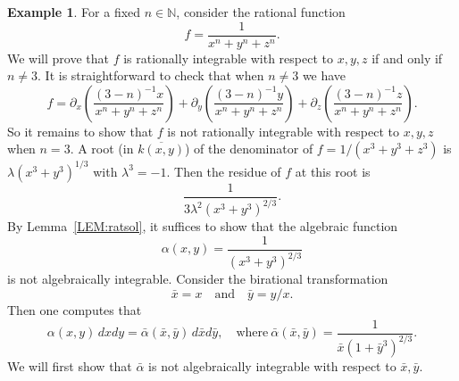\documentclass{amsart}
\theoremstyle{definition}
\newtheorem{example}[thm]{Example}
\def\NX{{\mathbb N}}
\numberwithin{equation}{section}
\numberwithin{thm}{section}
\begin{document}
\begin{example}
\label{EXAM:notint}
For a fixed $n\in \NX$, consider the rational function
\[
f = \frac{1}{x^n + y^n + z^n}.
\]
We will prove that $f$ is rationally integrable with respect to $x, y, z$ if and only if $n\neq 3$. It is straightforward to check that when $n\neq 3$ we have
\[
f = \partial_x\left(\frac{(3-n)^{-1}x}{x^n + y^n + z^n}\right) +  \partial_y\left(\frac{(3-n)^{-1}y}{x^n + y^n + z^n}\right) + \partial_z\left(\frac{(3-n)^{-1}z}{x^n + y^n + z^n}\right).
\]
So it remains to show that $f$ is not rationally integrable with respect to $x, y, z$ when $n=3$. A root (in $\overline{k(x, y)}$) of the denominator of $f = 1/(x^3+y^3+z^3)$ is $\lambda (x^3 + y^3)^{1/3}$ with $\lambda^3=-1$. Then the residue of $f$ at this root is
\[
\frac{1}{3\lambda^{2}(x^3 + y^3)^{2/3}}.
\]
By Lemma~\ref{LEM:ratsol}, it suffices to show that the algebraic function
\[
\alpha(x, y)= \frac{1}{(x^3 + y^3)^{2/3}}
\]
is not algebraically integrable. Consider the birational transformation
\[\bar{x} = x \quad \text{and} \quad \bar{y} = y/x.\]
Then one computes that
\begin{equation}\label{EQ:alphabaralpha}
\alpha(x, y) \,dx  dy = \bar{\alpha}(\bar x, \bar y)\,d\bar x  d \bar y, \quad \text{where}\ \bar \alpha (\bar x, \bar y)= \frac{1}{\bar{x}(1+\bar{y}^3)^{2/3}}.
\end{equation}
We will first show that $\bar \alpha$ is not algebraically integrable with respect to $\bar{x}, \bar{y}$.  


\end{example}
\end{document}

